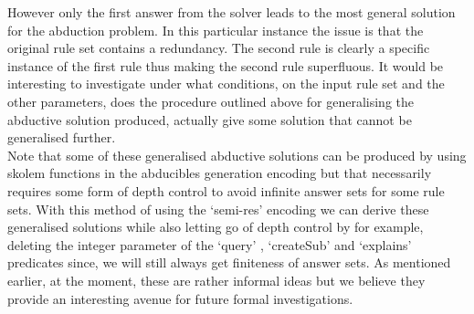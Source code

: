 However only the first answer from the solver leads to the most general
solution for the abduction problem. In this particular instance the issue is
that the original rule set contains a redundancy. The second rule is clearly a
specific instance of the first rule thus making the second rule
superfluous. It would be interesting to investigate under what conditions, on
the input rule set and the other parameters, does the procedure outlined above
for generalising the abductive solution produced, actually give some solution
that cannot be generalised further. \\Note that some of these generalised
abductive solutions can be produced by using skolem functions in the
abducibles generation encoding but that necessarily requires some form of
depth control to avoid infinite answer sets for some rule sets. With this
method of using the ‘semi-res’ encoding we can derive these generalised
solutions while also letting go of depth control by for example, deleting the
integer parameter of the ‘query’ , ‘createSub’ and ‘explains’ predicates
since, we will still always get finiteness of answer sets. As mentioned
earlier, at the moment, these are rather informal ideas but we believe they
provide an interesting avenue for future formal investigations.






